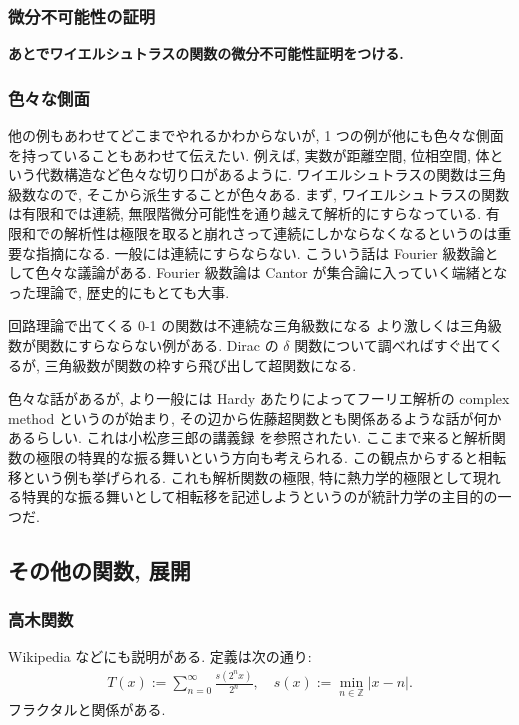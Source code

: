 \documentclass[openany, a4paper, oneside]{jsbook}
\theoremstyle{break}
\theoremstyle{breakdefn}
\begin{document}
\subsubsection{微分不可能性の証明}


\textbf{あとでワイエルシュトラスの関数の微分不可能性証明をつける.}
\subsubsection{色々な側面}


他の例もあわせてどこまでやれるかわからないが, 1 つの例が他にも色々な側面を持っていることもあわせて伝えたい.
例えば, 実数が距離空間, 位相空間, 体という代数構造など色々な切り口があるように.
ワイエルシュトラスの関数は三角級数なので, そこから派生することが色々ある.
まず, ワイエルシュトラスの関数は有限和では連続, 無限階微分可能性を通り越えて解析的にすらなっている.
有限和での解析性は極限を取ると崩れさって連続にしかならなくなるというのは重要な指摘になる.
一般には連続にすらならない.
こういう話は Fourier 級数論として色々な議論がある.
Fourier 級数論は Cantor が集合論に入っていく端緒となった理論で, 歴史的にもとても大事.

回路理論で出てくる 0-1 の関数は不連続な三角級数になる
より激しくは三角級数が関数にすらならない例がある.
Dirac の $\delta$ 関数について調べればすぐ出てくるが, 三角級数が関数の枠すら飛び出して超関数になる.

色々な話があるが, より一般には Hardy あたりによってフーリエ解析の complex method というのが始まり,
その辺から佐藤超関数とも関係あるような話が何かあるらしい.
これは小松彦三郎の講義録 \cite{HikosaburoKomatsu1} を参照されたい.
ここまで来ると解析関数の極限の特異的な振る舞いという方向も考えられる.
この観点からすると相転移という例も挙げられる.
これも解析関数の極限, 特に熱力学的極限として現れる特異的な振る舞いとして相転移を記述しようというのが統計力学の主目的の一つだ.
\subsection{その他の関数, 展開}

\subsubsection{高木関数}


Wikipedia などにも説明がある.
定義は次の通り:
\begin{align}
 T (x)
 :=
 \sum_{n=0}^{\infty} \frac{s (2^n x)}{2^n}, \quad
 s (x)
 :=
 \min_{n \in \mathbb{Z}} | x - n |.
\end{align}
フラクタルと関係がある.
\end{document}
